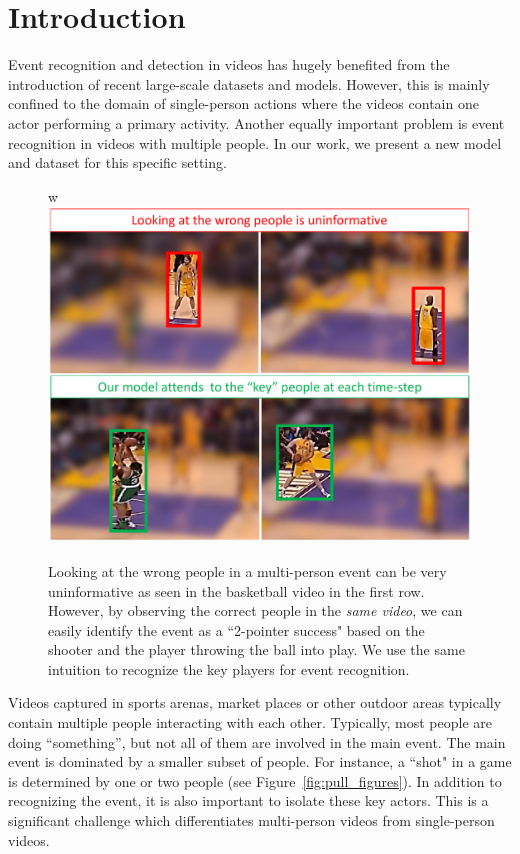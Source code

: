 \section{Introduction}

Event recognition and detection in videos has hugely benefited from the
introduction of recent large-scale datasets
\cite{THUMOS,UCF101,Karpathy_CVPR14,MED11} and models.  However, this is mainly
confined to the domain of single-person actions where the videos contain one
actor performing a primary activity.  Another equally important problem is
event recognition in videos with multiple people. In our work, we present a new
model and dataset for this specific setting.

\begin{figure}[ht!]
\begin{center}w
  \includegraphics[width=3.2 in]{images/pull_figure_v3_cropped.pdf}
\end{center}
\caption{Looking at the wrong people in a multi-person event can be very uninformative
  as seen in the basketball video in the first row. However, by observing the correct
  people in the \emph{same video}, we can easily identify the event as a ``2-pointer success" based
  on the shooter and the player throwing the ball into play. We use the same intuition
to recognize the key players for event recognition.}
\label{fig:pull_figure}
\end{figure}

Videos captured in sports arenas, market places or other outdoor areas
typically contain multiple people interacting with each other.
Typically, most people are doing ``something'', but not all of them are involved in the main event.
The main event is dominated by a smaller subset of people. For instance, a ``shot" in a game
is determined by one or two people (see Figure~\ref{fig:pull_figures}).
In addition to recognizing the event, it is also important
to isolate these key actors. This is a significant challenge which
differentiates multi-person videos from single-person videos.

